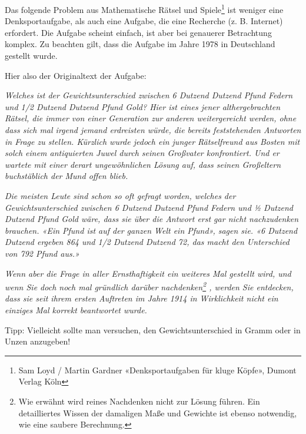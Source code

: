 Das folgende Problem aus Mathematische Rätsel und Spiele\footnote{Sam Loyd / Martin Gardner «Denksportaufgaben für kluge Köpfe», Dumont
Verlag Köln} ist weniger eine
Denksportaufgabe, als auch eine Aufgabe, die eine Recherche (z. B. Internet)
erfordert. Die Aufgabe scheint einfach, ist aber bei genauerer Betrachtung
komplex. Zu beachten gilt, dass die Aufgabe im Jahre 1978 in Deutschland
gestellt wurde.

Hier also der Originaltext der Aufgabe:

\textit{
Welches ist der Gewichtsunterschied zwischen 6
Dutzend Dutzend Pfund Federn und 1/2 Dutzend
Dutzend Pfund Gold?
Hier ist eines jener althergebrachten Rätsel, die immer
von einer Generation zur anderen weitergereicht
werden, ohne dass sich mal irgend jemand erdreisten
würde, die bereits feststehenden Antworten in Frage
zu stellen. Kürzlich wurde jedoch ein junger
Rätselfreund aus Bosten mit solch einem antiquierten
Juwel durch seinen Großvater konfrontiert. Und er
wartete mit einer derart ungewöhnlichen Lösung auf,
dass seinen Großeltern buchstäblich der Mund offen blieb.}


\textit{Die meisten Leute sind schon so oft gefragt worden,
welches der Gewichtsunterschied zwischen 6 Dutzend
Dutzend Pfund Federn und 1⁄2 Dutzend Dutzend Pfund
Gold wäre, dass sie über die Antwort erst gar nicht
nachzudenken brauchen. «Ein Pfund ist auf der ganzen
Welt ein Pfund», sagen sie. «6 Dutzend Dutzend
ergeben 864 und 1/2 Dutzend Dutzend 72, das macht
den Unterschied von 792 Pfund aus.» }


\textit{Wenn aber die Frage in aller Ernsthaftigkeit ein
weiteres Mal gestellt wird, und wenn Sie doch noch
mal gründlich darüber nachdenken\footnote{Wie erwähnt wird reines Nachdenken nicht zur Lösung führen. Ein detailliertes
Wissen der damaligen Maße und Gewichte ist ebenso notwendig, wie eine
saubere Berechnung.} , werden Sie
entdecken, dass sie seit ihrem ersten Auftreten im
Jahre 1914 in Wirklichkeit nicht ein einziges Mal
korrekt beantwortet wurde.
}%

Tipp: Vielleicht sollte man versuchen, den Gewichtsunterschied in Gramm oder
in Unzen anzugeben!




